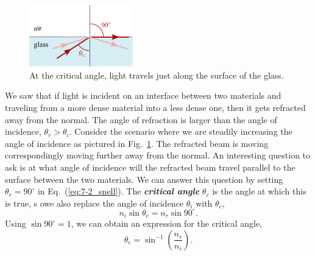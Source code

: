 \begin{figure}
    \centering
    \includegraphics[width=0.4\textwidth]{lesson7/7-3_total_internal_reflection.pdf}
    \caption[Total internal reflection]{At the critical angle, light travels just along the surface of the glass.}
    \label{fig:7-3_total_internal_reflection}
\end{figure}
We saw that if light is incident on an interface between two materials and traveling from a more dense material into a less dense one, then it gets refracted away from the normal.
The angle of refraction is larger than the angle of incidence, $\theta_r > \theta_i$. Consider the scenario where we are steadily increasing the angle of incidence as pictured in Fig.~\ref{fig:7-3_total_internal_reflection}.
The refracted beam is moving correspondingly moving further away from the normal.
An interesting question to ask is at what angle of incidence will the refracted beam travel parallel to the surface between the two materials.
We can answer this question by setting $\theta_r=90^{\circ}$ in Eq.~(\ref{eq:7-2_snell}).
The \textit{\textbf{critical angle}} $\theta_c$ is the angle at which this is true, s owe also replace the angle of incidence $\theta_i$ with $\theta_c$,
\begin{equation}
    n_i \sin \theta_c = n_r \sin 90^{\circ}.
    \label{eq:7-4_crit_angle}
\end{equation}
Using $\sin 90^{\circ} = 1$, we can obtain an expression for the critical angle,
\begin{equation}
    \theta_c=\sin ^{-1}\left(\frac{n_r}{n_i}\right).
    \label{eq:7-3_crit_angle}
\end{equation}


